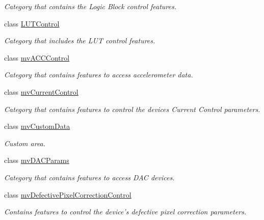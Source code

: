 \begin{DoxyCompactItemize}
\begin{DoxyCompactList}\small\item\em Category that contains the Logic Block control features. \end{DoxyCompactList}\item 
class \hyperlink{classmv_i_m_p_a_c_t_1_1acquire_1_1_gen_i_cam_1_1_l_u_t_control}{L\+U\+T\+Control}
\begin{DoxyCompactList}\small\item\em Category that includes the L\+U\+T control features. \end{DoxyCompactList}\item 
class \hyperlink{classmv_i_m_p_a_c_t_1_1acquire_1_1_gen_i_cam_1_1mv_a_c_c_control}{mv\+A\+C\+C\+Control}
\begin{DoxyCompactList}\small\item\em Category that contains features to access accelerometer data. \end{DoxyCompactList}\item 
class \hyperlink{classmv_i_m_p_a_c_t_1_1acquire_1_1_gen_i_cam_1_1mv_current_control}{mv\+Current\+Control}
\begin{DoxyCompactList}\small\item\em Category that contains features to control the devices Current Control parameters. \end{DoxyCompactList}\item 
class \hyperlink{classmv_i_m_p_a_c_t_1_1acquire_1_1_gen_i_cam_1_1mv_custom_data}{mv\+Custom\+Data}
\begin{DoxyCompactList}\small\item\em Custom area. \end{DoxyCompactList}\item 
class \hyperlink{classmv_i_m_p_a_c_t_1_1acquire_1_1_gen_i_cam_1_1mv_d_a_c_params}{mv\+D\+A\+C\+Params}
\begin{DoxyCompactList}\small\item\em Category that contains features to access D\+A\+C devices. \end{DoxyCompactList}\item 
class \hyperlink{classmv_i_m_p_a_c_t_1_1acquire_1_1_gen_i_cam_1_1mv_defective_pixel_correction_control}{mv\+Defective\+Pixel\+Correction\+Control}
\begin{DoxyCompactList}\small\item\em Contains features to control the device's defective pixel correction parameters. \end{DoxyCompactList}\item 

\end{DoxyCompactItemize}
